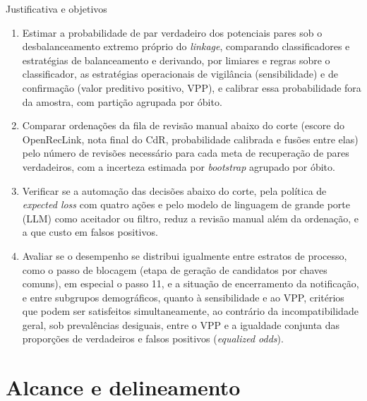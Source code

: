 \begin{chapter}{Justificativa e objetivos}
\begin{enumerate}
\item Estimar a probabilidade de par verdadeiro dos potenciais pares sob o desbalanceamento extremo próprio do \textit{linkage}, comparando classificadores e estratégias de balanceamento e derivando, por limiares e regras sobre o classificador, as estratégias operacionais de vigilância (sensibilidade) e de confirmação (valor preditivo positivo, VPP), e calibrar essa probabilidade fora da amostra, com partição agrupada por óbito.

\item Comparar ordenações da fila de revisão manual abaixo do corte (escore do OpenRecLink, nota final do CdR, probabilidade calibrada e fusões entre elas) pelo número de revisões necessário para cada meta de recuperação de pares verdadeiros, com a incerteza estimada por \textit{bootstrap} agrupado por óbito.

\item Verificar se a automação das decisões abaixo do corte, pela política de \textit{expected loss} com quatro ações e pelo modelo de linguagem de grande porte (LLM) como aceitador ou filtro, reduz a revisão manual além da ordenação, e a que custo em falsos positivos.

\item Avaliar se o desempenho se distribui igualmente entre estratos de processo, como o passo de blocagem (etapa de geração de candidatos por chaves comuns), em especial o passo 11, e a situação de encerramento da notificação, e entre subgrupos demográficos, quanto à sensibilidade e ao VPP, critérios que podem ser satisfeitos simultaneamente, ao contrário da incompatibilidade geral, sob prevalências desiguais, entre o VPP e a igualdade conjunta das proporções de verdadeiros e falsos positivos (\textit{equalized odds}).

\end{enumerate}

\section{Alcance e delineamento}


\end{chapter}
